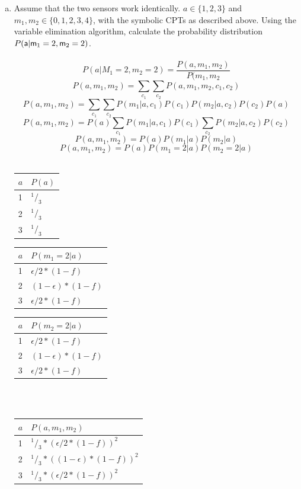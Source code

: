 \documentclass[12pt,a4paper,oneside]{article}
\begin{document}
\begin{enumerate}[a)]
\item Assume that the two sensors work identically. $a \in \{1, 2, 3\}$ and
  $m_1, m_2 \in \{0, 1, 2, 3, 4\}$, with the symbolic CPTs as described
  above. Using the variable elimination algorithm, calculate the probability
  distribution $P(\rv{a} | \rv{m}_1 = 2, \rv{m}_2 = 2)$.\\ \\
\[ P(a|M_1=2,m_2=2) = \frac{P(a,m_1,m_2)}{P(m_1,m_2} \] 
\[ P(a,m_1,m_2) = \sum_{c_1} \sum_{c_2} P(a,m_1,m_2,c_1,c_2) \] 
\[ P(a,m_1,m_2) = \sum_{c_1} \sum_{c_2} P(m_1 | a,c_1) P(c_1)  P(m_2 | a,c_2) P(c_2) P(a) \]
\[ P(a,m_1,m_2) =  P(a) \sum_{c_1} P(m_1 | a,c_1) P(c_1) \sum_{c_2} P(m_2 | a,c_2) P(c_2) \]
\[ P(a,m_1,m_2) =  P(a) P(m_1 | a) P(m_2 | a) \] 
\[ P(a,m_1,m_2) =  P(a) P(m_1 = 2 | a) P(m_2 = 2 | a) \] \\
\begin{minipage}[t]{0.2\textwidth}
\begin{tabular}{l|l}
$a$ & $P(a)$ \\ \hline
1&$^1/_3$ \\
2&$^1/_3$ \\
3&$^1/_3$ \\ 
\end{tabular}
\end{minipage}
\begin{minipage}[t]{0.3\textwidth}
\begin{tabular}{l|l}
$a$ & $P(m_1=2|a)$ \\ \hline
1&$\epsilon/2*(1-f)$ \\
2&$(1-\epsilon)*(1-f)$ \\
3&$\epsilon/2*(1-f)$ \\ 
\end{tabular}
\end{minipage}
\begin{minipage}[t]{0.3\textwidth}
\begin{tabular}{l|l}
$a$ & $P(m_2=2|a)$ \\ \hline
1&$\epsilon/2*(1-f)$ \\
2&$(1-\epsilon)*(1-f)$ \\
3&$\epsilon/2*(1-f)$ \\ 
\end{tabular} \\ \\
\end{minipage}

\begin{tabular}{l|l}
$a$ & $P(a , m_1, m_2)$ \\ \hline
1&$^1/_3*(\epsilon/2*(1-f))^2$ \\
2&$^1/_3*((1-\epsilon)*(1-f))^2$ \\
3&$^1/_3*(\epsilon/2*(1-f))^2$ \\ 
\end{tabular}


\end{enumerate}
\end{document}
